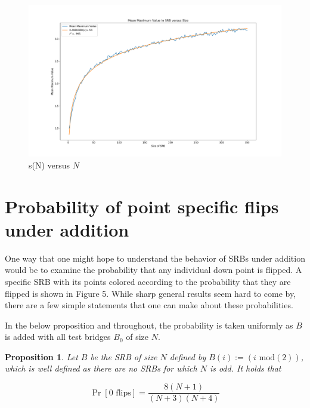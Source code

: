 \documentclass{article}
\newtheorem{proposition}{Proposition}
\theoremstyle{definition}
\begin{document}
\begin{figure}[h!]
\caption{s(N) versus $N$}
\centering
\includegraphics[width=\textwidth]{Figure_4}
\end{figure}


\section{Probability of point specific flips under addition}

One way that one might hope to understand the behavior of SRBs under addition would be to examine the probability that any individual down point is flipped. A specific SRB with its points colored according to the probability that they are flipped is shown in Figure 5. While sharp general results seem hard to come by, there are a few simple statements that one can make about these probabilities.

In the below proposition and throughout, the probability is taken uniformly as $B$ is added with all test bridges $B_0$ of size $N$.

\begin{proposition} Let $B$ be the SRB of size $N$ defined by $B(i):=(i\,\,\mathrm{mod}(2))$, which is well defined as there are no SRBs for which $N$ is odd. It holds that

$$\Pr[0\,\,\mathrm{flips}]=\frac{8(N+1)}{(N+3)(N+4)}$$
\end{proposition}
\end{document}
